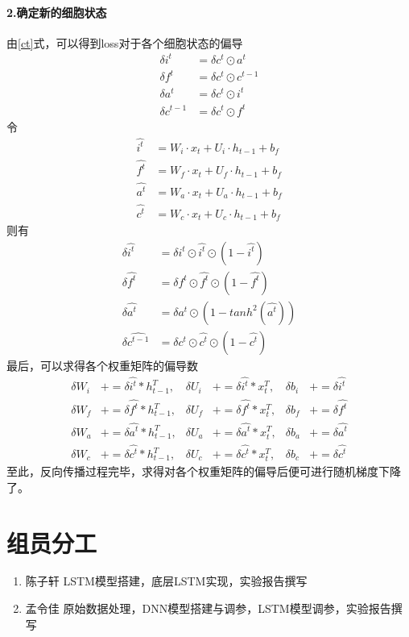 \documentclass[UTF8]{ctexart}
\begin{document}
\paragraph*{2.确定新的细胞状态}
由\ref{ct}式，可以得到loss对于各个细胞状态的偏导
\begin{alignat}
\delta i^t & = \delta c^t \odot a^t\\
\delta f^t & = \delta c^t \odot c^{t - 1}\\
\delta a^t & = \delta c^t \odot i^t\\
\delta c^{t-1} & = \delta c^t \odot f^t
\end{alignat}
令
\begin{align}
\hat{i^t} & = W_i\cdot x_t + U_i\cdot h_{t-1} + b_f\\ 
\hat{f^t} & = W_f\cdot x_t + U_f\cdot h_{t-1} + b_f\\
\hat{a^t} & = W_a\cdot x_t + U_a\cdot h_{t-1} + b_f\\
\hat{c^t} & = W_c\cdot x_t + U_c\cdot h_{t-1} + b_f
\end{align}
则有
\begin{align}
\delta \hat{i^t} & = \delta i^t \odot\hat{i^t}\odot (1-\hat{i^t})\\
\delta \hat{f^t} & = \delta f^t \odot\hat{f^t}\odot (1-\hat{f^t})\\
\delta \hat{a^t} & = \delta a^t \odot (1-tanh^2(\hat{a^t}))\\
\delta \hat{c^{t-1}} & = \delta c^t \odot\hat{c^t}\odot (1-\hat{c^t})
\end{align}
最后，可以求得各个权重矩阵的偏导数 
\begin{align}
\delta W_i & +=\delta \hat{i^t} * h_{t-1}^T,& \delta U_i & +=\delta \hat{i^t} * x_t^T, &\delta b_i &+= \delta \hat{i^t}\\
\delta W_f & +=\delta \hat{f^t} * h_{t-1}^T,& \delta U_f & +=\delta \hat{f^t} * x_t^T, &\delta b_f &+= \delta \hat{f^t}\\
\delta W_a & +=\delta \hat{a^t} * h_{t-1}^T,& \delta U_a & +=\delta \hat{a^t} * x_t^T, &\delta b_a &+= \delta \hat{a^t}\\
\delta W_c & +=\delta \hat{c^t} * h_{t-1}^T,& \delta U_c & +=\delta \hat{c^t} * x_t^T, &\delta b_c &+= \delta \hat{c^t}
\end{align}
至此，反向传播过程完毕，求得对各个权重矩阵的偏导后便可进行随机梯度下降了。
\section{组员分工}
\begin{enumerate}
    \item 陈子轩 LSTM模型搭建，底层LSTM实现，实验报告撰写
    \item 孟令佳 原始数据处理，DNN模型搭建与调参，LSTM模型调参，实验报告撰写
\end{enumerate}
\end{document}

